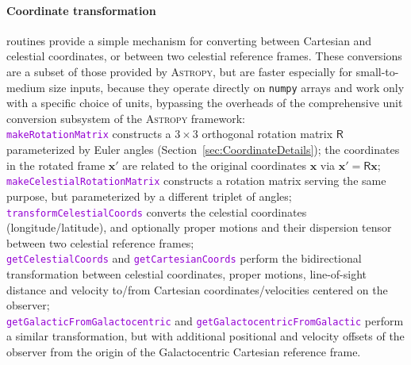\documentclass[12pt]{article}
\newcommand{\ttt}[1]{\textcolor{darkviolet}{\texttt{#1}}}
\let\oldparagraph\paragraph
\renewcommand{\paragraph}[1]{\vspace{-2mm}\oldparagraph{#1}}
\begin{document}
\paragraph{Coordinate transformation} routines provide a simple mechanism for converting between Cartesian and celestial coordinates, or between two celestial reference frames. These conversions are a subset of those provided by \textsc{Astropy}, but are faster especially for small-to-medium size inputs, because they operate directly on \texttt{numpy} arrays and work only with a specific choice of units, bypassing the overheads of the comprehensive unit conversion subsystem of the \textsc{Astropy} framework:\\
\ttt{makeRotationMatrix} constructs a $3\times3$ orthogonal rotation matrix $\mathsf R$ parameterized by Euler angles (Section~\ref{sec:CoordinateDetails}); the coordinates in the rotated frame $\boldsymbol x'$ are related to the original coordinates $\boldsymbol x$ via $\boldsymbol x' = \mathsf R \boldsymbol x$;\\
\ttt{makeCelestialRotationMatrix} constructs a rotation matrix serving the same purpose, but parameterized by a different triplet of angles;\\
\ttt{transformCelestialCoords} converts the celestial coordinates (longitude/latitude), and optionally proper motions and their dispersion tensor between two celestial reference frames;\\
\ttt{getCelestialCoords} and \ttt{getCartesianCoords} perform the bidirectional transformation between celestial coordinates, proper motions, line-of-sight distance and velocity to/from Cartesian coordinates/velocities centered on the observer;\\
\ttt{getGalacticFromGalactocentric} and \ttt{getGalactocentricFromGalactic} perform a similar transformation, but with additional positional and velocity offsets of the observer from the origin of the Galactocentric Cartesian reference frame.
\end{document}
